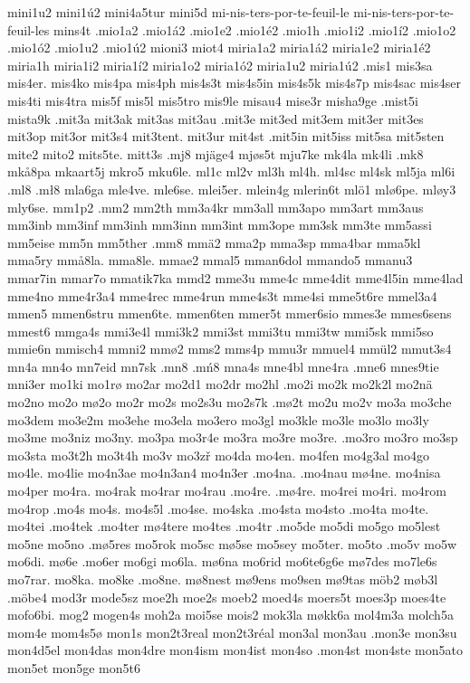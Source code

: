 {{mini1u2
mini1ú2
mini4a5tur
mini5d
mi-nis-ters-por-te-feuil-le
mi-nis-ters-por-te-feuil-les
mins4t
.mio1a2
.mio1á2
.mio1e2
.mio1é2
.mio1h
.mio1i2
.mio1í2
.mio1o2
.mio1ó2
.mio1u2
.mio1ú2
mioni3
miot4
miria1a2
miria1á2
miria1e2
miria1é2
miria1h
miria1i2
miria1í2
miria1o2
miria1ó2
miria1u2
miria1ú2
.mis1
mis3sa
mis4er.
mis4ko
mis4pa
mis4ph
mis4s3t
mis4s5in
mis4s5k
mis4s7p
mis4sac
mis4ser
mis4ti
mis4tra
mis5f
mis5l
mis5tro
mis9le
misau4
mise3r
misha9ge
.mist5i
mista9k
.mit3a
mit3ak
mit3as
mit3au
.mit3e
mit3ed
mit3em
mit3er
mit3es
mit3op
mit3or
mit3s4
mit3tent.
mit3ur
mit4st
.mit5in
mit5iss
mit5sa
mit5sten
mite2
mito2
mits5te.
mitt3s
.mj8
mjäge4
mjøs5t
mju7ke
mk4la
mk4li
.mk8
mkå8pa
mkaart5j
mkro5
mku6le.
ml1c
ml2v
ml3h
ml4h.
ml4sc
ml4sk
ml5ja
ml6i
.ml8
.mł8
mla6ga
mle4ve.
mle6se.
mlei5er.
mlein4g
mlerin6t
mlö1
mlø6pe.
mløy3
mly6se.
mm1p2
.mm2
mm2th
mm3a4kr
mm3all
mm3apo
mm3art
mm3aus
mm3inb
mm3inf
mm3inh
mm3inn
mm3int
mm3ope
mm3sk
mm3te
mm5assi
mm5eise
mm5n
mm5ther
.mm8
mmä2
mma2p
mma3sp
mma4bar
mma5kl
mma5ry
mmå8la.
mma8le.
mmae2
mmal5
mman6dol
mmando5
mmanu3
mmar7in
mmar7o
mmatik7ka
mmd2
mme3u
mme4c
mme4dit
mme4l5in
mme4lad
mme4no
mme4r3a4
mme4rec
mme4run
mme4s3t
mme4si
mme5t6re
mmel3a4
mmen5
mmen6stru
mmen6te.
mmen6ten
mmer5t
mmer6sio
mmes3e
mmes6sens
mmest6
mmga4s
mmi3e4l
mmi3k2
mmi3st
mmi3tu
mmi3tw
mmi5sk
mmi5so
mmie6n
mmisch4
mmni2
mmø2
mms2
mms4p
mmu3r
mmuel4
mmül2
mmut3s4
mn4a
mn4o
mn7eid
mn7sk
.mn8
.mń8
mna4s
mne4bl
mne4ra
.mne6
mnes9tie
mni3er
mo1ki
mo1rø
mo2ar
mo2d1
mo2dr
mo2hl
.mo2i
mo2k
mo2k2l
mo2nä
mo2no
mo2o
mø2o
mo2r
mo2s
mo2s3u
mo2s7k
.mø2t
mo2u
mo2v
mo3a
mo3che
mo3dem
mo3e2m
mo3ehe
mo3ela
mo3ero
mo3gl
mo3kle
mo3le
mo3lo
mo3ly
mo3me
mo3niz
mo3ny.
mo3pa
mo3r4e
mo3ra
mo3re
mo3re.
.mo3ro
mo3ro
mo3sp
mo3sta
mo3t2h
mo3t4h
mo3v
mo3zř
mo4da
mo4en.
mo4fen
mo4g3al
mo4go
mo4le.
mo4lie
mo4n3ae
mo4n3an4
mo4n3er
.mo4na.
.mo4nau
mø4ne.
mo4nisa
mo4per
mo4ra.
mo4rak
mo4rar
mo4rau
.mo4re.
.mø4re.
mo4rei
mo4ri.
mo4rom
mo4rop
.mo4s
mo4s.
mo4s5l
.mo4se.
mo4ska
.mo4sta
mo4sto
.mo4ta
mo4te.
mo4tei
.mo4tek
.mo4ter
mø4tere
mo4tes
.mo4tr
.mo5de
mo5di
mo5go
mo5lest
mo5ne
mo5no
.mø5res
mo5rok
mo5sc
mø5se
mo5sey
mo5ter.
mo5to
.mo5v
mo5w
mo6di.
mø6e
.mo6er
mo6gi
mo6la.
mø6na
mo6rid
mo6te6g6e
mø7des
mo7le6s
mo7rar.
mo8ka.
mo8ke
.mo8ne.
mø8nest
mø9ens
mo9sen
mø9tas
möb2
møb3l
.möbe4
mod3r
mode5sz
moe2h
moe2s
moeb2
moed4s
moers5t
moes3p
moes4te
mofo6bi.
mog2
mogen4s
moh2a
moi5se
mois2
mok3la
møkk6a
mol4m3a
molch5a
mom4e
mom4s5ø
mon1s
mon2t3real
mon2t3réal
mon3al
mon3au
.mon3e
mon3su
mon4d5el
mon4das
mon4dre
mon4ism
mon4ist
mon4so
.mon4st
mon4ste
mon5ato
mon5et
mon5ge
mon5t6
}}
